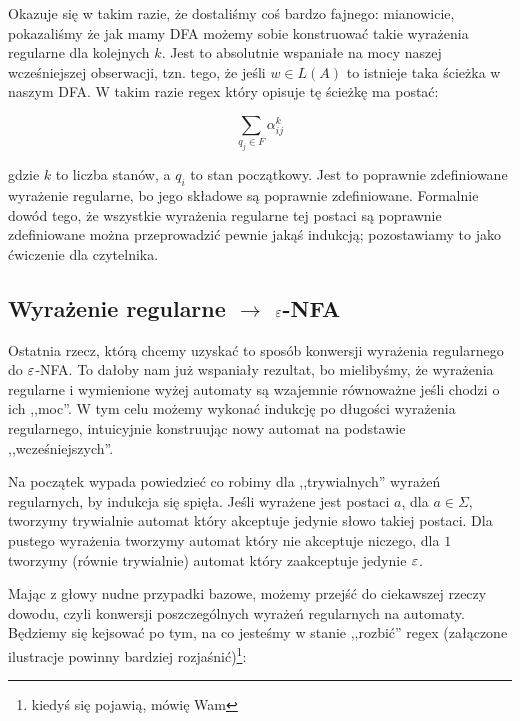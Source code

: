     Okazuje się w takim razie, że dostaliśmy coś bardzo fajnego: mianowicie, pokazaliśmy że jak mamy DFA możemy sobie konstruować takie wyrażenia regularne dla kolejnych \(k\). Jest to absolutnie wspaniałe na mocy naszej wcześniejszej obserwacji, tzn. tego, że jeśli \(w \in L(A) \) to istnieje taka ścieżka w naszym DFA. W takim razie regex który opisuje tę ścieżkę ma postać:
    
    \[
        \sum_{q_j \in F} \alpha^{k}_{ij}
    \]
    
    gdzie \(k\) to liczba stanów, a \(q_i\) to stan początkowy. Jest to poprawnie zdefiniowane wyrażenie regularne, bo jego składowe są poprawnie zdefiniowane. Formalnie dowód tego, że wszystkie wyrażenia regularne tej postaci są poprawnie zdefiniowane można przeprowadzić pewnie jakąś indukcją; pozostawiamy to jako ćwiczenie dla czytelnika.
    
    \subsection{Wyrażenie regularne \texorpdfstring{\( \rightarrow \)}{na} \texorpdfstring{\(\varepsilon\)}{epsilon}-NFA}
    
    Ostatnia rzecz, którą chcemy uzyskać to sposób konwersji wyrażenia regularnego do \(\varepsilon\)-NFA. To dałoby nam już wspaniały rezultat, bo mielibyśmy, że wyrażenia regularne i wymienione wyżej automaty są wzajemnie równoważne jeśli chodzi o ich ,,moc''. W tym celu możemy wykonać indukcję po długości wyrażenia regularnego, intuicyjnie konstruując nowy automat na podstawie ,,wcześniejszych''.
    
    Na początek wypada powiedzieć co robimy dla ,,trywialnych'' wyrażeń regularnych, by indukcja się spięła. Jeśli wyrażene jest postaci \(a\), dla \( a \in \Sigma\), tworzymy trywialnie automat który akceptuje jedynie słowo takiej postaci. Dla pustego wyrażenia tworzymy automat który nie akceptuje niczego, dla \(1\) tworzymy (równie trywialnie) automat który zaakceptuje jedynie \(\varepsilon\). 
    
    Mając z głowy nudne przypadki bazowe, możemy przejść do ciekawszej rzeczy dowodu, czyli konwersji poszczególnych wyrażeń regularnych na automaty. Będziemy się kejsować po tym, na co jesteśmy w stanie ,,rozbić'' regex (załączone ilustracje powinny bardziej rozjaśnić)\footnote{kiedyś się pojawią, mówię Wam}:
    
